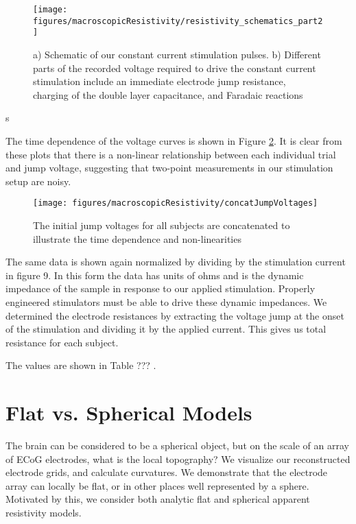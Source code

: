 \begin{figure}[ht]
	\centering
	\texttt{[image: figures/macroscopicResistivity/resistivity\_schematics\_part2]}
	\caption[Constant current stimulation]{a) Schematic of our constant current stimulation pulses. b) Different parts of the recorded voltage required to drive the constant current stimulation include an immediate electrode jump resistance, charging of the double layer capacitance, and Faradaic reactions}
	\label{fig:mrStimSchem}
\end{figure}s

The time dependence of the voltage curves is shown in Figure \ref{fig:concatjumpvoltages}. It is clear from these plots that there is a non-linear relationship between each individual trial and jump voltage, suggesting that two-point measurements in our stimulation setup are noisy. 

\begin{figure}[ht]
	\centering
	\texttt{[image: figures/macroscopicResistivity/concatJumpVoltages]}
	\caption[Jump voltages over time all subjects]{The initial jump voltages for all subjects are concatenated to illustrate the time dependence and non-linearities}
	\label{fig:concatjumpvoltages}
\end{figure}


The same data is shown again normalized by dividing by the stimulation current in figure 9. In this form the data has units of ohms and is the dynamic impedance of the sample in response to our applied stimulation. Properly engineered stimulators must be able to drive these dynamic impedances. We determined the electrode resistances by extracting the voltage jump at the onset of the stimulation and dividing it by the applied current.
This gives us total resistance for each subject.

The values are shown in Table ??? .

\section{Flat vs. Spherical Models}
The brain can be considered to be a spherical object, but on the scale of an array of ECoG electrodes, what is the local topography? We visualize our reconstructed electrode grids, and calculate curvatures. We demonstrate that the electrode array can locally be flat, or in other places well represented by a sphere. Motivated by this, we consider both analytic flat and spherical apparent resistivity models. 

